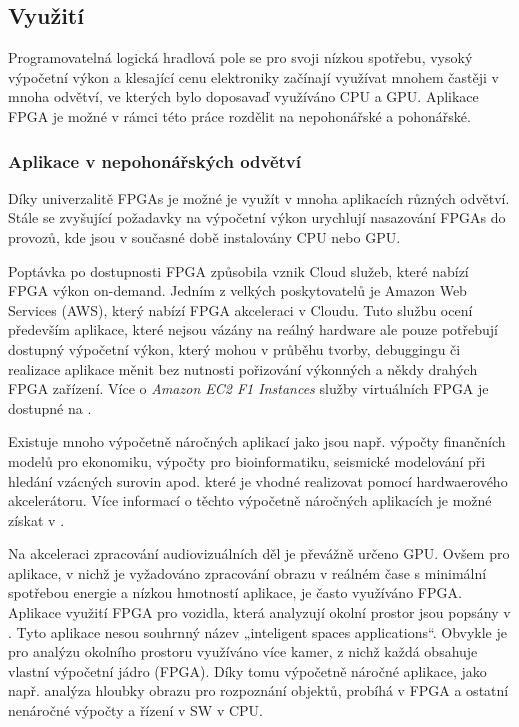 \documentclass[a4paper, twoside, 11pt]{article}
\begin{document}
			
			\subsection{Využití}
			Programovatelná logická hradlová pole se pro svoji nízkou spotřebu, vysoký výpočetní výkon a klesající cenu elektroniky začínají využívat mnohem častěji v mnoha odvětví, ve kterých bylo doposavaď využíváno CPU a GPU. Aplikace FPGA je možné v rámci této práce rozdělit na nepohonářské a pohonářské.

			\subsubsection{Aplikace v nepohonářských odvětví}
				Díky univerzalitě FPGAs je možné je využít v mnoha aplikacích různých odvětví. Stále se zvyšující požadavky na výpočetní výkon urychlují nasazování FPGAs do provozů, kde jsou v současné době instalovány CPU nebo GPU.\par
				Poptávka po dostupnosti FPGA způsobila vznik Cloud služeb, které nabízí FPGA výkon on-demand. Jedním z velkých poskytovatelů je Amazon Web Services (AWS), který nabízí FPGA akceleraci v Cloudu. Tuto službu ocení především aplikace, které nejsou vázány na reálný hardware ale pouze potřebují dostupný výpočetní výkon, který mohou v průběhu tvorby, debuggingu či realizace aplikace měnit bez nutnosti pořizování výkonných a někdy drahých FPGA zařízení. Více o \textit{Amazon EC2 F1 Instances} služby virtuálních FPGA je dostupné na \cite{amazon-ec2-f1}.\par
				Existuje mnoho výpočetně náročných aplikací jako jsou např. výpočty finančních modelů pro ekonomiku, výpočty pro bioinformatiku, seismické modelování při hledání vzácných surovin apod. které je vhodné realizovat pomocí hardwaerového akcelerátoru. Více informací o těchto výpočetně náročných aplikacích je možné získat v \cite{wim-high-performance-computing-using-fpgas}.\par
				Na akceleraci zpracování audiovizuálních děl je převážně určeno GPU. Ovšem pro aplikace, v nichž je vyžadováno zpracování obrazu v reálném čase s minimální spotřebou energie a nízkou hmotností aplikace, je často využíváno FPGA. Aplikace využití FPGA pro vozidla, která analyzují okolní prostor jsou popsány v \cite{andina-advanced-features-and-industrial-applications-of-fpga}. Tyto aplikace nesou souhrnný název „inteligent spaces applications“. Obvykle je pro analýzu okolního prostoru využíváno více kamer, z nichž každá obsahuje vlastní výpočetní jádro (FPGA). Díky tomu výpočetně náročné aplikace, jako např. analýza hloubky obrazu pro rozpoznání objektů, probíhá v FPGA a ostatní nenáročné výpočty a řízení v SW v CPU. \cite{andina-advanced-features-and-industrial-applications-of-fpga}\par
\end{document}
